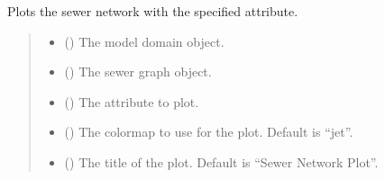 \documentclass[letterpaper,10pt,english]{sphinxmanual}
\begin{document}
\begin{fulllineitems}
\label{\detokenize{pysewer:pysewer.plotting.plot_sewer_attributes}}
\pysigstartsignatures
{}
\pysigstopsignatures
\sphinxAtStartPar
Plots the sewer network with the specified attribute.
\begin{quote}\begin{description}
\begin{itemize}
\item {} 
\sphinxAtStartPar
{} () \textendash{} The model domain object.

\item {} 
\sphinxAtStartPar
{} () \textendash{} The sewer graph object.

\item {} 
\sphinxAtStartPar
{} () \textendash{} The attribute to plot.

\item {} 
\sphinxAtStartPar
{} (\sphinxstyleliteralemphasis{\sphinxupquote{, }}) \textendash{} The colormap to use for the plot. Default is “jet”.

\item {} 
\sphinxAtStartPar
{} (\sphinxstyleliteralemphasis{\sphinxupquote{, }}) \textendash{} The title of the plot. Default is “Sewer Network Plot”.


\end{itemize}
\end{description}
\end{quote}
\end{fulllineitems}
\end{document}
